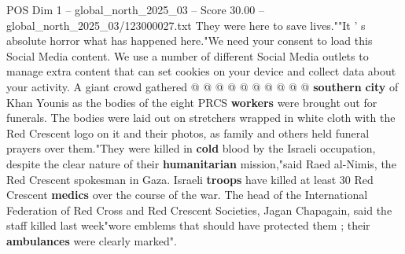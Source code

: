\begin{textsample}{POS Dim 1 – global\_north\_2025\_03 – Score 30.00 – global\_north\_2025\_03/123000027.txt}
They were here to save lives.""It ' s absolute horror what has happened here."We need your consent to load this Social Media content.
We use a number of different Social Media outlets to manage extra content that can set cookies on your device and collect data about your activity.
A giant crowd gathered @ @ @ @ @ @ @ @ @ @ \textbf{southern} \textbf{city} of Khan Younis as the bodies of the eight PRCS \textbf{workers} were brought out for funerals.
The bodies were laid out on stretchers wrapped in white cloth with the Red Crescent logo on it and their photos, as family and others held funeral prayers over them."They were killed in \textbf{cold} blood by the Israeli occupation, despite the clear nature of their \textbf{humanitarian} mission,"said Raed al-Nimis, the Red Crescent spokesman in Gaza.
Israeli \textbf{troops} have killed at least 30 Red Crescent \textbf{medics} over the course of the war.
The head of the International Federation of Red Cross and Red Crescent Societies, Jagan Chapagain, said the staff killed last week"wore emblems that should have protected them ; their \textbf{ambulances} were clearly marked".

\end{textsample}
